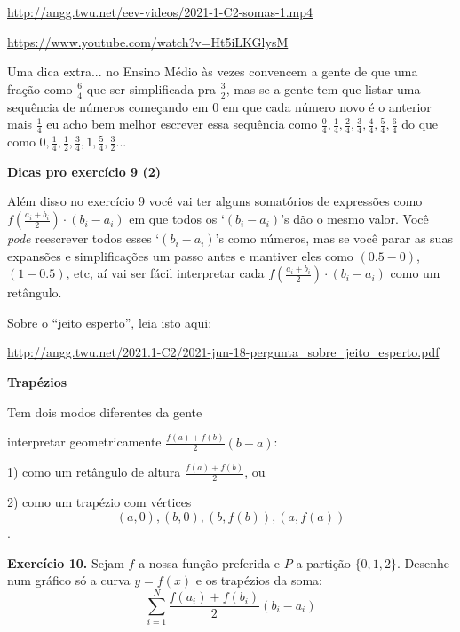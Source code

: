 \documentclass[oneside,12pt]{article}
\begin{document}
\ssk


\url{http://angg.twu.net/eev-videos/2021-1-C2-somas-1.mp4}

\url{https://www.youtube.com/watch?v=Ht5iLKGlysM}

\msk

Uma dica extra... no Ensino Médio às vezes convencem a gente de que
uma fração como $\frac64$  que
ser simplificada pra $\frac32$, mas se a gente tem que listar uma
sequência de números começando em 0 em que cada número novo é o
anterior mais $\frac14$ eu acho bem melhor escrever essa sequência
como $\frac04, \frac14, \frac24, \frac34, \frac44, \frac54, \frac64$
do que como $0, \frac14, \frac12, \frac34, 1, \frac54, \frac32$...

\newpage

{\bf Dicas pro exercício 9 (2)}

Além disso no exercício 9 você vai ter alguns somatórios de expressões
como $f(\frac{a_i+b_i}{2})·(b_i-a_i)$ em que todos os `$(b_i-a_i)$'s
dão o mesmo valor. Você {\sl pode} reescrever todos esses
`$(b_i-a_i)$'s como números, mas se você parar as suas expansões e
simplificações um passo antes e mantiver eles como $(0.5 - 0)$, $(1 -
0.5)$, etc, aí vai ser fácil interpretar cada
$f(\frac{a_i+b_i}{2})·(b_i-a_i)$ como um retângulo.


\bsk

Sobre o ``jeito esperto'', leia isto aqui:

\ssk

{\scriptsize

\url{http://angg.twu.net/2021.1-C2/2021-jun-18-pergunta_sobre_jeito_esperto.pdf}

}



\newpage


{\bf Trapézios}

Tem dois modos diferentes da gente

interpretar geometricamente $\frac{f(a)+f(b)}{2} (b-a)$:

\msk

1) como um retângulo de altura $\frac{f(a)+f(b)}{2}$, ou

2) como um trapézio com vértices
%
$$(a,0), (b,0), (b,f(b)), (a,f(a))$$.

{\bf Exercício 10.} Sejam $f$ a nossa função preferida e $P$ a
partição $\{0,1,2\}$. Desenhe num gráfico só a curva $y=f(x)$ e os
trapézios da soma:
%
$$\sum_{i=1}^N \frac{f(a_i)+f(b_i)}{2} (b_i-a_i)$$
\end{document}
